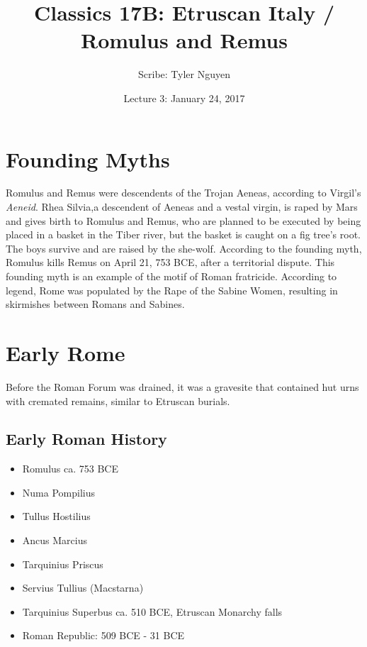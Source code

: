 \documentclass{article}
\begin{document}
\title{Classics 17B: Etruscan Italy / Romulus and Remus}
\author{Scribe: Tyler Nguyen}
\date{Lecture 3: January 24, 2017}
\maketitle
\section{Founding Myths}
Romulus and Remus were descendents of the Trojan Aeneas, according to Virgil's \textit{Aeneid}.  Rhea Silvia,a descendent of Aeneas and a vestal virgin, is raped by Mars and gives birth to Romulus and Remus, who are planned to be executed by being placed in a basket in the Tiber river, but the basket is caught on a fig tree's root.  The boys survive and are raised by the she-wolf.  According to the founding myth, Romulus kills Remus on April 21, 753 BCE, after a territorial dispute.  This founding myth is an example of the motif of Roman fratricide.  According to legend, Rome was populated by the Rape of the Sabine Women, resulting in skirmishes between Romans and Sabines.
\section{Early Rome}
Before the Roman Forum was drained, it was a gravesite that contained hut urns with cremated remains, similar to Etruscan burials.
\subsection{Early Roman History}
\begin{itemize}
\item Romulus ca. 753 BCE
\item Numa Pompilius
\item Tullus Hostilius
\item Ancus Marcius
\item Tarquinius Priscus
\item Servius Tullius (Macstarna)
\item Tarquinius Superbus ca. 510 BCE, Etruscan Monarchy falls
\item Roman Republic: 509 BCE - 31 BCE
\end{itemize}
\end{document}
